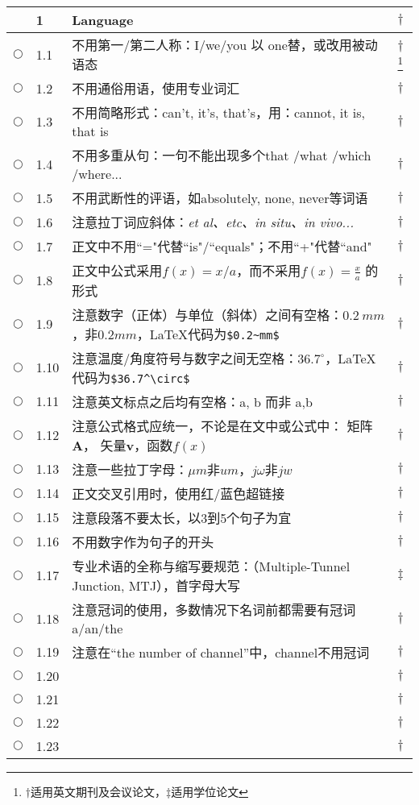 \documentclass{ctexart}
\begin{document}
\begin{center}
\begin{longtable}{|l|l|p{}|l|}
 & 1 & \textcolor[rgb]{0.00,0.00,1.00}{\textbf{Language}}& $\dagger$\\\hline
$\bigcirc$& 1.1 & 不用第一/第二人称：I/we/you 以 one替，或改用被动语态 & $\dagger$\footnote{$\dagger$适用英文期刊及会议论文，$\ddagger$适用学位论文}\\\hline
$\bigcirc$& 1.2 & 不用通俗用语，使用专业词汇& $\dagger$\\\hline
$\bigcirc$& 1.3 & 不用简略形式：can't, it's, that's，用：cannot, it is, that is & $\dagger$\\\hline
$\bigcirc$& 1.4 & 不用多重从句：一句不能出现多个that /what /which /where...& $\dagger$\\\hline
$\bigcirc$& 1.5 & 不用武断性的评语，如absolutely, none, never等词语 & $\dagger$\\\hline
$\bigcirc$& 1.6 & 注意拉丁词应斜体：\it{et al、etc、in situ、in vivo}...& $\dagger$\\\hline
$\bigcirc$& 1.7 & 正文中不用``="代替``is"/``equals"；不用``+"代替``and"& $\dagger$\\\hline
$\bigcirc$& 1.8 & 正文中公式采用$f(x)=x/a$，而不采用$f(x)=\frac{x}{a}$ 的形式& $\dagger$\\\hline
$\bigcirc$& 1.9 & 注意数字（正体）与单位（斜体）之间有空格：$0.2~mm$，非$0.2mm$，\LaTeX 代码为\verb+$0.2~mm$+& $\dagger$\\\hline
$\bigcirc$& 1.10 & 注意温度/角度符号与数字之间无空格：$36.7^\circ$，\LaTeX 代码为\verb+$36.7^\circ$+ & $\dagger$\\\hline
$\bigcirc$& 1.11 & 注意英文标点之后均有空格：a, b 而非  a,b & $\dagger$\\\hline
$\bigcirc$& 1.12 & 注意公式格式应统一，不论是在文中或公式中： 矩阵 $\mathbf{A}$， 矢量$\mathbf{v}$，函数$f(x)$& $\dagger$\\\hline
$\bigcirc$& 1.13 & 注意一些拉丁字母：$\mu m$非$um$，$j\omega$非$jw$ & $\dagger$\\\hline
$\bigcirc$& 1.14 & 正文交叉引用时，使用红/蓝色超链接 & $\dagger$\\\hline%
$\bigcirc$& 1.15 & 注意段落不要太长，以3到5个句子为宜 & $\dagger$\\\hline
$\bigcirc$& 1.16 & 不用数字作为句子的开头 & $\dagger$\\\hline
$\bigcirc$& 1.17 & 专业术语的全称与缩写要规范：（Multiple-Tunnel Junction, MTJ），首字母大写 & $\ddagger$\\\hline
$\bigcirc$& 1.18 & 注意冠词的使用，多数情况下名词前都需要有冠词a/an/the & $\dagger$\\\hline
$\bigcirc$& 1.19 & 注意在“the number of channel”中，channel不用冠词 & $\dagger$\\\hline
$\bigcirc$& 1.20 &  & $\dagger$\\\hline
$\bigcirc$& 1.21 &  & $\dagger$\\\hline
$\bigcirc$& 1.22 &  & $\dagger$\\\hline
$\bigcirc$& 1.23 &  & $\dagger$\\\hline
\hline


\end{longtable}
\end{center}
\end{document}
